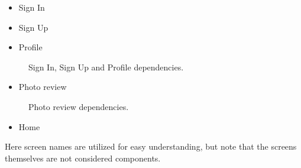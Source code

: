 \begin{itemize}
    \item 
    Sign In
    \item 
    Sign Up
    \item 
    Profile
\end{itemize}

\begin{figure}[H]
    \centering
    \caption{\label{fig:signin-dependencies}Sign In, Sign Up and Profile dependencies.}
\end{figure}
 
\begin{itemize}
    \item 
    Photo review
\end{itemize}

\begin{figure}[H]
    \centering
    \caption{\label{fig:photoreview-dependencies}Photo review dependencies.}
\end{figure}

\begin{itemize}
    \item 
    Home
\end{itemize}

Here screen names are utilized for easy understanding, but note that the screens themselves are not considered components.

